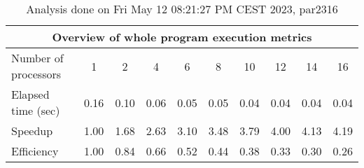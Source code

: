 \begin{table}[h]
\begin{center}
\begin{tabular}{|l|c|c|c|c|c|c|c|c|c|}
\hline
\multicolumn{10}{|c|}{Overview of whole program execution metrics} \\
\hline
\hline
Number of processors & 1 & 2 & 4 & 6 & 8 & 10 & 12 & 14 & 16 \\
\hline
Elapsed time (sec)      &       0.16 &       0.10 &       0.06 &       0.05 &       0.05 &       0.04 &       0.04 &       0.04 &       0.04 \\
\hline
Speedup                 &       1.00 &       1.68 &       2.63 &       3.10 &       3.48 &       3.79 &       4.00 &       4.13 &       4.19 \\
\hline
Efficiency              &       1.00 &       0.84 &       0.66 &       0.52 &       0.44 &       0.38 &       0.33 &       0.30 &       0.26 \\
\hline
\end{tabular}
\end{center}
\caption{ Analysis done on Fri May 12 08:21:27 PM CEST 2023, par2316}
\end{table}
